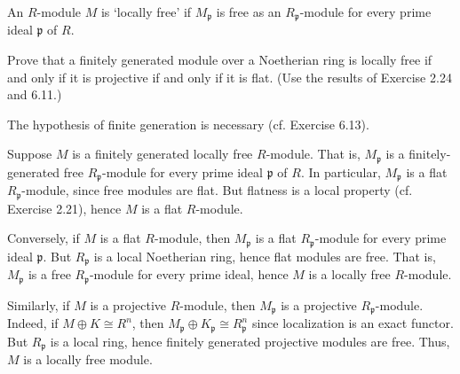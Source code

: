 \documentclass[../../master.tex]{subfiles}
\begin{document}
\begin{problem}
    An $R$-module $M$ is `locally free' if $M_\mathfrak{p}$ is free as an $R_\mathfrak{p}$-module for every prime ideal $\mathfrak{p}$ of $R$.

    Prove that a finitely generated module over a Noetherian ring is locally free if and only if it is projective if and only if it is flat.
    (Use the results of Exercise 2.24 and 6.11.)

    The hypothesis of finite generation is necessary (cf. Exercise 6.13).
\end{problem}

\begin{solution}
    Suppose $M$ is a finitely generated locally free $R$-module.
    That is, $M_\mathfrak{p}$ is a finitely-generated free $R_\mathfrak{p}$-module for every prime ideal $\mathfrak{p}$ of $R$.
    In particular, $M_\mathfrak{p}$ is a flat $R_\mathfrak{p}$-module, since free modules are flat.
    But flatness is a local property (cf. Exercise 2.21), hence $M$ is a flat $R$-module.

    Conversely, if $M$ is a flat $R$-module, then $M_\mathfrak{p}$ is a flat $R_\mathfrak{p}$-module for every prime ideal $\mathfrak{p}$.
    But $R_\mathfrak{p}$ is a local Noetherian ring, hence flat modules are free.
    That is, $M_\mathfrak{p}$ is a free $R_\mathfrak{p}$-module for every prime ideal, hence $M$ is a locally free $R$-module.

    Similarly, if $M$ is a projective $R$-module, then $M_\mathfrak{p}$ is a projective $R_\mathfrak{p}$-module.
    Indeed, if $M \oplus K \cong R^{n}$, then $M_\mathfrak{p} \oplus K_\mathfrak{p} \cong R_\mathfrak{p}^{n}$ since localization is an exact functor.
    But $R_\mathfrak{p}$ is a local ring, hence finitely generated projective modules are free.
    Thus, $M$ is a locally free module.


\end{solution}
\end{document}
